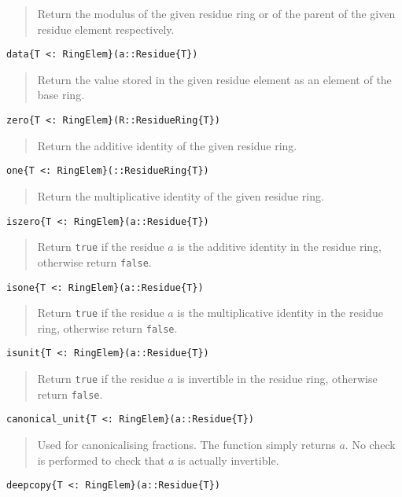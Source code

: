 \documentclass[a4paper,10pt]{article}
\newcommand{\code}{\lstinline}
\newcommand{\desc}[1]{\vspace{-3mm}\begin{quote}#1\end{quote}}
\begin{document}
\desc{Return the modulus of the given residue ring or of the parent of the given
residue element respectively.}

\begin{lstlisting}
data{T <: RingElem}(a::Residue{T})
\end{lstlisting}

\desc{Return the value stored in the given residue element as an element of the
base ring.}

\begin{lstlisting}
zero{T <: RingElem}(R::ResidueRing{T})
\end{lstlisting}

\desc{Return the additive identity of the given residue ring.}

\begin{lstlisting}
one{T <: RingElem}(::ResidueRing{T})
\end{lstlisting}

\desc{Return the multiplicative identity of the given residue ring.}

\begin{lstlisting}
iszero{T <: RingElem}(a::Residue{T})
\end{lstlisting}

\desc{Return \code{true} if the residue $a$ is the additive identity in the
residue ring, otherwise return \code{false}.}

\begin{lstlisting}
isone{T <: RingElem}(a::Residue{T})
\end{lstlisting}

\desc{Return \code{true} if the residue $a$ is the multiplicative identity in
the residue ring, otherwise return \code{false}.}

\begin{lstlisting}
isunit{T <: RingElem}(a::Residue{T})
\end{lstlisting}

\desc{Return \code{true} if the residue $a$ is invertible in the residue ring,
otherwise return \code{false}.}

\begin{lstlisting}
canonical_unit{T <: RingElem}(a::Residue{T})
\end{lstlisting}

\desc{Used for canonicalising fractions. The function simply returns $a$. No
check is performed to check that $a$ is actually invertible.}

\begin{lstlisting}
deepcopy{T <: RingElem}(a::Residue{T})
\end{lstlisting}
\end{document}
